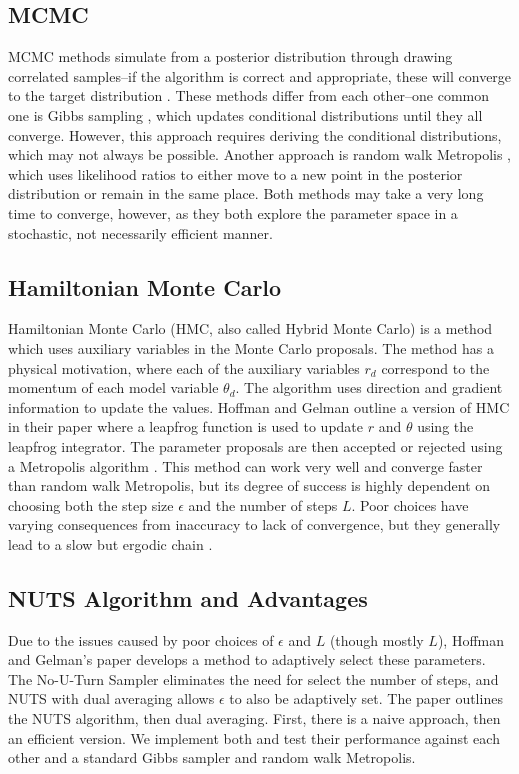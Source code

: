 \documentclass[12pt]{article}
\begin{document}
\subsection{MCMC}
MCMC methods simulate from a posterior distribution through drawing correlated samples--if the algorithm is correct and appropriate, these will converge to the target distribution \cite{neal}. These methods differ from each other--one common one is Gibbs sampling \cite{geman}, which updates conditional distributions until they all converge. However, this approach requires deriving the conditional distributions, which may not always be possible. Another approach is random walk Metropolis \cite{metropolis}, which uses likelihood ratios to either move to a new point in the posterior distribution or remain in the same place. Both methods may take a very long time to converge, however, as they both explore the parameter space in a stochastic, not necessarily efficient manner. 
\subsection{Hamiltonian Monte Carlo}
Hamiltonian Monte Carlo (HMC, also called Hybrid Monte Carlo) \cite{duane, neal} is a method which uses auxiliary variables in the Monte Carlo proposals. The method has a physical motivation, where each of the auxiliary variables $r_d$ correspond to the momentum of each model variable $\theta_d$. The algorithm uses direction and gradient information to update the values. Hoffman and Gelman outline a version of HMC in their paper where a leapfrog function is used to update $r$ and $\theta$ using the leapfrog integrator. The parameter proposals are then accepted or rejected using a Metropolis algorithm \cite{metropolis}. This method can work very well and converge faster than random walk Metropolis, but its degree of success is highly dependent on choosing both the step size $\epsilon$ and the number of steps $L$. Poor choices have varying consequences from inaccuracy to lack of convergence, but they generally lead to a slow but ergodic chain \cite{homan2014no}.

\subsection{NUTS Algorithm and Advantages}
Due to the issues caused by poor choices of $\epsilon$ and $L$ (though mostly $L$), Hoffman and Gelman's paper develops a method to adaptively select these parameters. The No-U-Turn Sampler eliminates the need for select the number of steps, and NUTS with dual averaging allows $\epsilon$ to also be adaptively set. The paper outlines the NUTS algorithm, then dual averaging. First, there is a naive approach, then an efficient version. We implement both and test their performance against each other and a standard Gibbs sampler and random walk Metropolis. 
\end{document}
